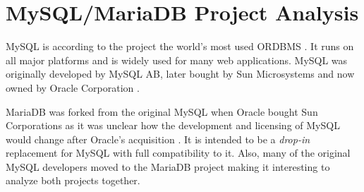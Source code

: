 
\section{MySQL/MariaDB Project Analysis} %


MySQL is according to the project the world's most used \ac{ORDBMS}
\cite{MySQLSun}. It runs on all major platforms and is widely used for many web
applications. MySQL was originally developed by MySQL AB, later bought by Sun
Microsystems and now owned by Oracle Corporation
\cite{MySQLSun,MySQLOracle,MySQLHistory}.

MariaDB was forked from the original MySQL when Oracle bought Sun Corporations
as it was unclear how the development and licensing of MySQL would change after
Oracle's acquisition \cite{MySQLAbout,MySQLBehind}. It is intended to be a
\emph{drop-in} replacement for MySQL with full compatibility to it. Also, many
of the original MySQL developers moved to the MariaDB project making it
interesting to analyze both projects together.

